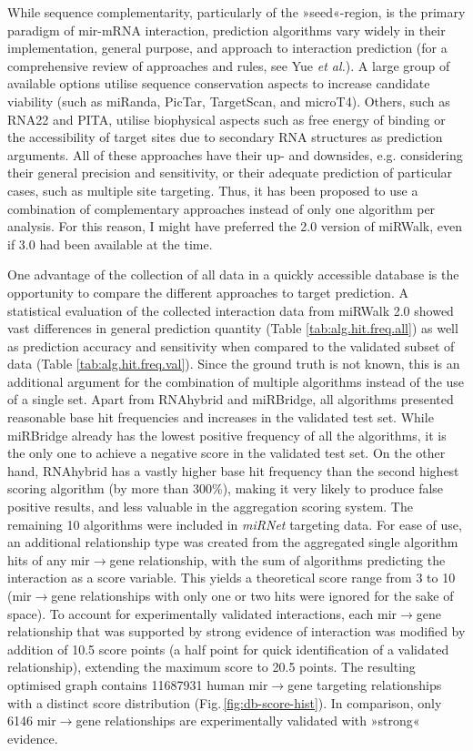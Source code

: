 While sequence complementarity, particularly of the »seed«-region, is the primary paradigm of \ac{mir}-mRNA interaction, prediction algorithms vary widely in their implementation, general purpose, and approach to interaction prediction (for a comprehensive review of approaches and rules, see Yue \emph{et al.}\cite{Yue2009}). A large group of available options utilise sequence conservation aspects to increase candidate viability (such as miRanda, PicTar, TargetScan, and microT4). Others, such as RNA22 and PITA, utilise biophysical aspects such as free energy of binding or the accessibility of target sites due to secondary RNA structures as prediction arguments. All of these approaches have their up- and downsides, e.g. considering their general precision and sensitivity, or their adequate prediction of particular cases, such as multiple site targeting. Thus, it has been proposed to use a combination of complementary approaches instead of only one algorithm per analysis.\cite{Witkos2011} For this reason, I might have preferred the 2.0 version of miRWalk, even if 3.0 had been available at the time.

One advantage of the collection of all data in a quickly accessible database is the opportunity to compare the different approaches to target prediction. A statistical evaluation of the collected interaction data from miRWalk 2.0 showed vast differences in general prediction quantity (Table \ref{tab:alg.hit.freq.all}) as well as prediction accuracy and sensitivity when compared to the validated subset of data (Table \ref{tab:alg.hit.freq.val}). Since the ground truth is not known, this is an additional argument for the combination of multiple algorithms instead of the use of a single set. Apart from RNAhybrid and miRBridge, all algorithms presented reasonable base hit frequencies and increases in the validated test set. While miRBridge already has the lowest positive frequency of all the algorithms, it is the only one to achieve a negative score in the validated test set. On the other hand, RNAhybrid has a vastly higher base hit frequency than the second highest scoring algorithm (by more than \num{300}\%), making it very likely to produce false positive results, and less valuable in the aggregation scoring system. The remaining 10 algorithms were included in \textit{miRNet} targeting data. For ease of use, an additional relationship type was created from the aggregated single algorithm hits of any \ac{mir}$\to$gene relationship, with the sum of algorithms predicting the interaction as a score variable. This yields a theoretical score range from \num{3} to \num{10} (\ac{mir}$\to$gene relationships with only one or two hits were ignored for the sake of space). To account for experimentally validated interactions, each \ac{mir}$\to$gene relationship that was supported by strong evidence of interaction was modified by addition of \num{10.5} score points (a half point for quick identification of a validated relationship), extending the maximum score to \num{20.5} points. The resulting optimised graph contains \num{11687931} human \ac{mir}$\to$gene targeting relationships with a distinct score distribution (Fig.\,\ref{fig:db-score-hist}). In comparison, only 6146 \ac{mir}$\to$gene relationships are experimentally validated with »strong« evidence.

